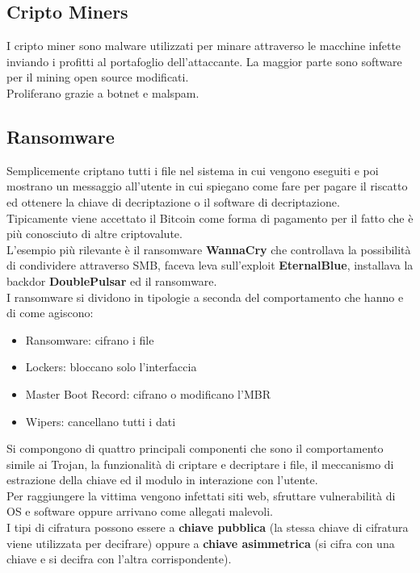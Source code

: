 \subsection{Cripto Miners}
I cripto miner sono malware utilizzati per minare attraverso le macchine infette inviando i profitti al portafoglio dell'attaccante.
La maggior parte sono software per il mining open source modificati.\\
Proliferano grazie a botnet e malspam.

\subsection{Ransomware}
Semplicemente criptano tutti i file nel sistema in cui vengono eseguiti e poi mostrano un messaggio all'utente in cui spiegano come fare per pagare il riscatto ed ottenere la chiave di decriptazione o il software di decriptazione.\\
Tipicamente viene accettato il Bitcoin come forma di pagamento per il fatto che è più conosciuto di altre criptovalute.\\
L'esempio più rilevante è il ransomware \textbf{WannaCry} che controllava la possibilità di condividere attraverso \acrshort{SMB}, faceva leva sull'exploit \textbf{EternalBlue}, installava la backdor \textbf{DoublePulsar} ed il ransomware.\\
I ransomware si dividono in tipologie a seconda del comportamento che hanno e di come agiscono:
\begin{itemize}[noitemsep]
    \item Ransomware: cifrano i file
    \item Lockers: bloccano solo l'interfaccia
    \item Master Boot Record: cifrano o modificano l'\acrshort{MBR}
    \item Wipers: cancellano tutti i dati
\end{itemize}
Si compongono di quattro principali componenti che sono il comportamento simile ai Trojan, la funzionalità di criptare e decriptare i file, il meccanismo di estrazione della chiave ed il modulo in interazione con l'utente.\\
Per raggiungere la vittima vengono infettati siti web, sfruttare vulnerabilità di \acrshort{OS} e software oppure arrivano come allegati malevoli.\\
I tipi di cifratura possono essere a \textbf{chiave pubblica} (la stessa chiave di cifratura viene utilizzata per decifrare) oppure a \textbf{chiave asimmetrica} (si cifra con una chiave e si decifra con l'altra corrispondente).\\

